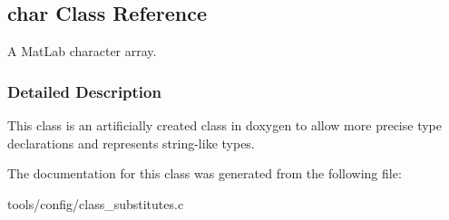 \hypertarget{classchar}{}\subsection{char Class Reference}
\label{classchar}


A Mat\+Lab character array.  




\subsubsection{Detailed Description}
This class is an artificially created class in doxygen to allow more precise type declarations and represents string-\/like types. 

The documentation for this class was generated from the following file\+:\begin{DoxyCompactItemize}
\item 
tools/config/class\+\_\+substitutes.\+c\end{DoxyCompactItemize}
